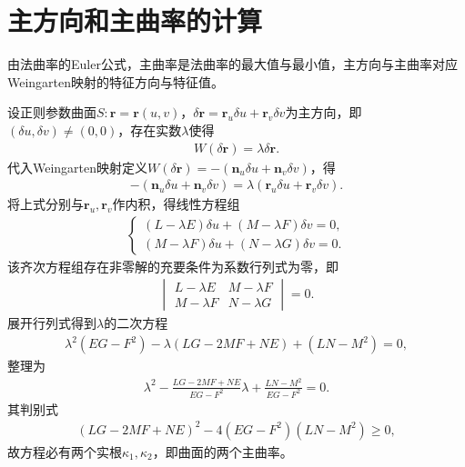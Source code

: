 \documentclass[../../main.tex]{subfiles}%
\begin{document}
\section{主方向和主曲率的计算}

由法曲率的Euler公式，主曲率是法曲率的最大值与最小值，主方向与主曲率对应Weingarten映射的特征方向与特征值。

设正则参数曲面$S:\boldsymbol{r}=\boldsymbol{r}(u,v)$，$\delta\boldsymbol{r}=\boldsymbol{r}_u\delta u+\boldsymbol{r}_v\delta v$为主方向，即$(\delta u,\delta v)\neq(0,0)$，存在实数$\lambda$使得
\begin{align}
W(\delta\boldsymbol{r})=\lambda\delta\boldsymbol{r}.\label{eq:weingarten_eigen_eq}
\end{align}
代入Weingarten映射定义$W(\delta\boldsymbol{r})=-(\boldsymbol{n}_u\delta u+\boldsymbol{n}_v\delta v)$，得
\begin{align}
-(\boldsymbol{n}_u\delta u+\boldsymbol{n}_v\delta v)=\lambda(\boldsymbol{r}_u\delta u+\boldsymbol{r}_v\delta v).\label{eq:weingarten_eigen_expand}
\end{align}
将上式分别与$\boldsymbol{r}_u,\boldsymbol{r}_v$作内积，得线性方程组
\begin{align}
\begin{cases}
(L-\lambda E)\delta u+(M-\lambda F)\delta v=0,\\
(M-\lambda F)\delta u+(N-\lambda G)\delta v=0.
\end{cases}\label{eq:principal_dir_linear_eq}
\end{align}
该齐次方程组存在非零解的充要条件为系数行列式为零，即
\begin{align}
\begin{vmatrix}
L-\lambda E & M-\lambda F\\
M-\lambda F & N-\lambda G
\end{vmatrix}=0.\label{eq:principal_curvature_char_eq}
\end{align}
展开行列式得到$\lambda$的二次方程
\begin{align}
\lambda^2(EG-F^2)-\lambda(LG-2MF+NE)+(LN-M^2)=0,\label{eq:principal_curvature_quad_eq}
\end{align}
整理为
\begin{align}
\lambda^2-\frac{LG-2MF+NE}{EG-F^2}\lambda+\frac{LN-M^2}{EG-F^2}=0.\label{eq:principal_curvature_quad_simp}
\end{align}
其判别式
\begin{align*}
(LG-2MF+NE)^2-4(EG-F^2)(LN-M^2)\geqslant0,
\end{align*}
故方程必有两个实根$\kappa_1,\kappa_2$，即曲面的两个主曲率。
\end{document}
